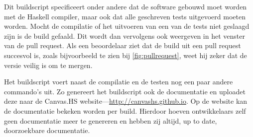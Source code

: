 Dit buildscript specificeert onder andere dat de software gebouwd moet worden met de Haskell compiler, maar ook dat alle geschreven tests uitgevoerd moeten worden. Mocht de compilatie of het uitvoeren van een van de tests niet geslaagd zijn is de build gefaald. Dit wordt dan vervolgens ook weergeven in het venster van de pull request. Als een beoordelaar ziet dat de build uit een pull request succesvol is, zoals bijvoorbeeld te zien bij \autoref{fig:pullrequest}, weet hij zeker dat de versie veilig is om te mergen.

Het buildscript voert naast de compilatie en de testen nog een paar andere commando's uit. Zo genereert het buildscript ook de documentatie en uploadet deze naar de Canvas.HS website—\url{http://canvashs.github.io}. Op de website kan de documentatie bekeken worden per build. Hierdoor hoeven ontwikkelaars zelf geen documentatie meer te genereren en hebben zij altijd, up to date, doorzoekbare documentatie.





